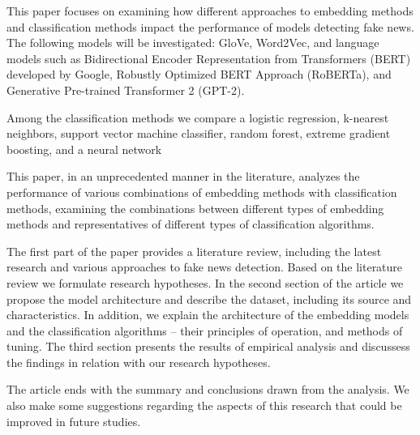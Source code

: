 This paper focuses on examining how different approaches to embedding methods and classification methods impact the performance of models detecting fake news. The following models will be investigated: GloVe, Word2Vec, and language models such as Bidirectional Encoder Representation from Transformers (BERT) developed by Google, Robustly Optimized BERT Approach (RoBERTa), and Generative Pre-trained Transformer 2 (GPT-2).

Among the classification methods we compare a logistic regression, k-nearest neighbors, support vector machine classifier, random forest, extreme gradient boosting, and a neural network

This paper, in an unprecedented manner in the literature, analyzes the performance of various combinations of embedding methods with classification methods, examining the combinations between different types of embedding methods and representatives of different types of classification algorithms.

The first part of the paper provides a literature review, including the latest research and various approaches to fake news detection. Based on the literature review we formulate research hypotheses.
In the second section of the article we propose the model architecture and describe the dataset, including its source and characteristics. In addition, we explain the architecture of the embedding models and the classification algorithms -- their principles of operation, and methods of tuning. The third section presents the results of empirical analysis and discussess the findings in relation with our research hypotheses.

The article ends with the summary and conclusions drawn from the analysis. We also make some suggestions  regarding the aspects of this research that could be improved in future studies.